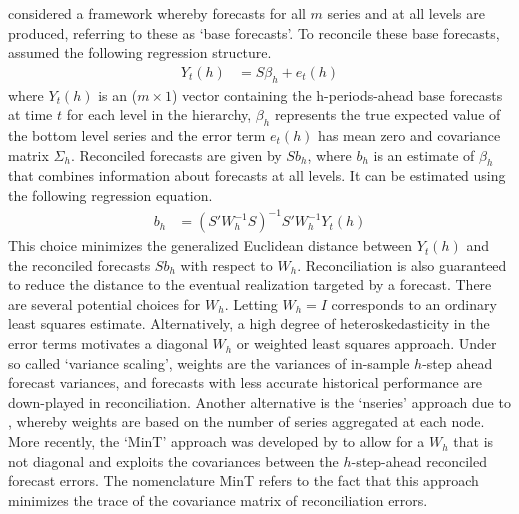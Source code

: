 \documentclass[a4paper,fleqn,11pt]{article}
\begin{document}
\cite{Hyndman2011} considered a framework whereby forecasts for all $m$ series and at all levels are produced, referring to these as `base forecasts'.  To reconcile these base forecasts, \cite{Hyndman2011} assumed the following regression structure.
\begin{align}
	Y_t(h) &= S\beta_{h} + e_t(h)
	\label{eq:regstruct}
\end{align}
where $Y_t(h)$ is an ($m \times 1$) vector containing the h-periods-ahead base forecasts at time $t$ for each level in the hierarchy, $\beta_{h}$ represents the true expected value of the bottom level series and the error term $e_t(h)$ has mean zero and covariance matrix $\Sigma_h$. Reconciled forecasts are given by $Sb_{h}$, where $b_h$ is an estimate of $\beta_{h}$ that combines information about forecasts at all levels. It can be estimated using the following regression equation.
\begin{align}
	\label{eq:reg}
	b_{h} &= \left(S'W_h^{-1}S \right)^{-1} S'W_h^{-1}Y_t(h)
\end{align}
This choice minimizes the generalized Euclidean distance between $Y_t(h)$ and the reconciled forecasts $Sb_{h}$ with respect to $W_h$. Reconciliation is also guaranteed to reduce the distance to the eventual realization targeted by a forecast. There are several potential choices for $W_h$. Letting $W_h=I$ corresponds to an ordinary least squares estimate.  Alternatively, a high degree of heteroskedasticity in the error terms motivates a diagonal $W_h$ or weighted least squares approach. Under so called `variance scaling', weights are the variances of in-sample $h$-step ahead forecast variances, and forecasts with less accurate historical performance are down-played in reconciliation.  Another alternative is the `nseries' approach due to \cite{Athanasopoulos2017}, whereby weights are based on the number of series aggregated at each node.  More recently, the `MinT' approach was developed by \cite{Wickramasuriya2015} to allow for a $W_h$ that is not diagonal and exploits the covariances between the $h$-step-ahead reconciled forecast errors. The nomenclature MinT refers to the fact that this approach minimizes the trace of the covariance matrix of reconciliation errors.\\
\end{document}
